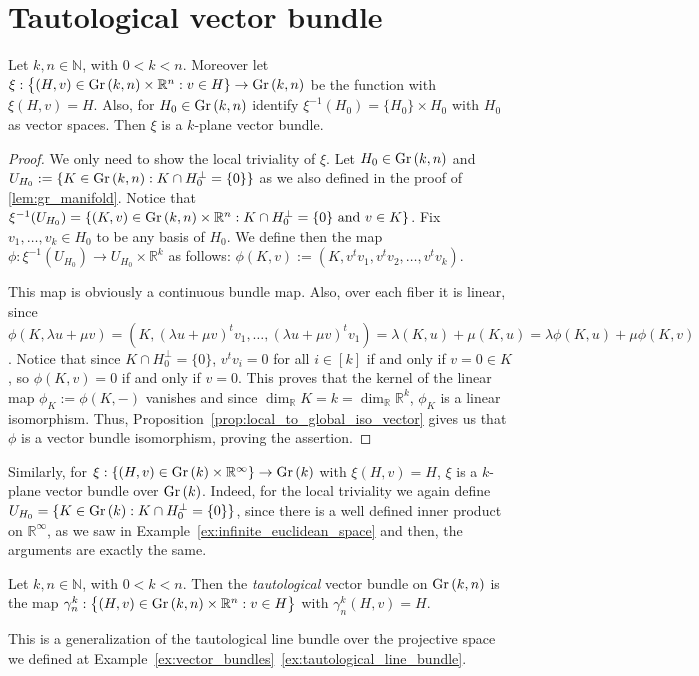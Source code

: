 \section{Tautological vector bundle}
\begin{proposition} Let $k,n\in\mathbb{N}$, with $0<k<n$. Moreover let $\xi:\big\{(H,v)\in\Gr{k}{n}\times\mathbb{R}^n:v\in H\}\to\Gr{k}{n}$ be the function with $\xi(H,v)=H$. Also, for $H_0\in\Gr{k}{n}$ identify $\xi^{-1}(H_0)=\{H_0\}\times H_0$ with $H_0$ as vector spaces. Then $\xi$ is a $k$-plane vector bundle.
\end{proposition}
\begin{proof} We only need to show the local triviality of $\xi$. Let $H_0\in\Gr{k}{n}$ and $U_{H_0}:=\{K\in\Gr{k}{n}:K\cap H_0^{\perp}=\{0\}\}$ as we also defined in the proof of \ref{lem:gr_manifold}. Notice that $\xi^{-1}(U_{H_0})=\{(K,v)\in\Gr{k}{n}\times\mathbb{R}^n:K\cap H_0^{\perp}=\{0\}\text{ and }v\in K\}$. Fix $v_1,\ldots,v_k\in H_0$ to be any basis of $H_0$. We define then the map $\phi:\xi^{-1}(U_{H_0})\to U_{H_0}\times\mathbb{R}^k$ as follows: $\phi(K,v):=(K,v^tv_1,v^tv_2,\ldots,v^tv_k)$.

This map is obviously a continuous bundle map. Also, over each fiber it is linear, since $\phi(K,\lambda u+\mu v)=(K,(\lambda u+\mu v)^tv_1,\ldots,(\lambda u+\mu v)^tv_1)=\lambda(K,u)+\mu(K,u)=\lambda\phi(K,u)+\mu\phi(K,v)$. Notice that since $K\cap H_0^{\perp}=\{0\}$, $v^tv_i=0$ for all $i\in[k]$ if and only if $v=0\in K$, so $\phi(K,v)=0$ if and only if $v=0$. This proves that the kernel of the linear map $\phi_K:=\phi(K,-)$ vanishes and since $\dim_{\mathbb{R}}K=k=\dim_{\mathbb{R}}\mathbb{R}^k$, $\phi_K$ is a linear isomorphism. Thus, Proposition~\ref{prop:local_to_global_iso_vector} gives us that $\phi$ is a vector bundle isomorphism, proving the assertion.
\end{proof}
\begin{remark} Similarly, for $\xi:\{(H,v)\in\Gr{k}\times\mathbb{R}^{\infty}\}\to\Gr{k}$ with $\xi(H,v)=H$, $\xi$ is a $k$-plane vector bundle over $\Gr{k}$. Indeed, for the local triviality we again define $U_{H_0}=\{K\in\Gr{k}:K\cap H_0^{\perp}=\{0\}\}$, since there is a well defined inner product on $\mathbb{R}^{\infty}$, as we saw in Example~\ref{ex:infinite_euclidean_space} and then, the arguments are exactly the same.
\end{remark}

\begin{definition} Let $k,n\in\mathbb{N}$, with $0<k<n$. Then the \emph{tautological} vector bundle on $\Gr{k}{n}$ is the map $\gamma_n^k:\big\{(H,v)\in\Gr{k}{n}\times\mathbb{R}^n:v\in H\big\}$ with $\gamma_n^k(H,v)=H$.
\end{definition}
\begin{remark} This is a generalization of the tautological line bundle over the projective space we defined at Example~\ref{ex:vector_bundles}~\!\ref{ex:tautological_line_bundle}.
\end{remark}

